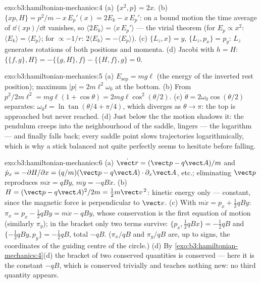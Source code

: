 \begin{solution}{exo:b3:hamiltonian-mechanics:4}
(a) $\{x^2, p\} = 2x$. (b) $\{xp, H\} = p^2/m - x\,E_p'(x) = 2E_k -
x\,E_p'$: on a bound motion the time average of $\dd(xp)/\dd t$
vanishes, so $\langle 2E_k\rangle = \langle x\,E_p'\rangle$ --- the
virial theorem (for $E_p \propto x^2$: $\langle E_k\rangle = \langle
E_p\rangle$; for $\propto -1/r$: $2\langle E_k\rangle = -\langle
E_p\rangle$). (c) $\{L_z, x\} = y$, $\{L_z, p_x\} = p_y$: $L_z$
generates rotations of both positions and momenta. (d) Jacobi with $h
= H$: $\{\{f, g\}, H\} = -\{\{g, H\}, f\} - \{\{H, f\}, g\} = 0$.
\end{solution}

\begin{solution}{exo:b3:hamiltonian-mechanics:5}
(a) $E_{\text{sep}} = mg\ell$ (the energy of the inverted rest
position); maximum $|p| = 2m\ell^2\omega_0$ at the bottom. (b) From
$p^2/2m\ell^2 = mg\ell(1 + \cos\theta) = 2mg\ell\cos^2(\theta/2)$. (c)
$\dot\theta = 2\omega_0\cos(\theta/2)$ separates: $\omega_0t =
\ln\tan(\theta/4 + \pi/4)$, which diverges as $\theta \to \pi$: the
top is approached but never reached. (d) Just below the  the
motion shadows it: the pendulum creeps into the neighbourhood of the
saddle, lingers --- the logarithm --- and finally falls back; every
saddle point slows trajectories logarithmically, which is why a stick
balanced not quite perfectly seems to hesitate before falling.
\end{solution}

\begin{solution}{exo:b3:hamiltonian-mechanics:6}
(a) $\dot{\vect r} = (\vect p - q\vect A)/m$ and $\dot p_x =
-\partial H/\partial x = (q/m)(\vect p - q\vect A)\cdot\partial_x\vect
A$, etc.; eliminating $\vect p$ reproduces $m\ddot x = qB\dot y$,
$m\ddot y = -qB\dot x$. (b) $H = (\vect p - q\vect A)^2/2m = \tfrac12
m\vect v^{\,2}$: kinetic energy only --- constant, since the magnetic
force is perpendicular to $\vect v$. (c) With $m\dot x = p_x +
\tfrac12 qBy$: $\pi_x = p_x - \tfrac12 qBy = m\dot x - qBy$, whose
conservation is the first equation of motion (similarly $\pi_y$); in
the bracket only two terms survive: $\{p_x, \tfrac12 qBx\} = -\tfrac12
qB$ and $\{-\tfrac12 qBy, p_y\} = -\tfrac12 qB$, total $-qB$. ($\pi_x/qB$ and $\pi_y/qB$
are, up to signs, the coordinates of the guiding centre of the
circle.) (d) By \cref{exo:b3:hamiltonian-mechanics:4}(d) the bracket
of two conserved quantities is conserved --- here it is the constant
$-qB$, which is conserved trivially and teaches nothing new: no third
quantity appears.
\end{solution}

